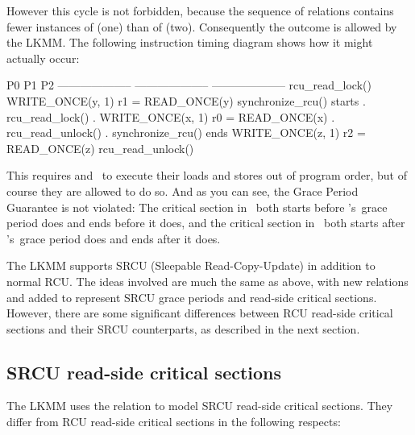 However this cycle is not forbidden, because the sequence of
relations contains fewer instances of  (one) than of
 (two).
Consequently the outcome is allowed by the LKMM\@.
The following instruction timing diagram shows how it might actually
occur:

\begin{VerbatimU}
P0                      P1                      P2
--------------------    --------------------    --------------------
rcu_read_lock()
WRITE_ONCE(y, 1)
                        r1 = READ_ONCE(y)
                        synchronize_rcu() starts
                        .                       rcu_read_lock()
                        .                       WRITE_ONCE(x, 1)
r0 = READ_ONCE(x)       .
rcu_read_unlock()       .
                        synchronize_rcu() ends
                        WRITE_ONCE(z, 1)
                                                r2 = READ_ONCE(z)
                                                rcu_read_unlock()
\end{VerbatimU}

This requires  and~ to execute their loads and stores out of
program order, but of course they are allowed to do so.
And as you can see, the Grace Period Guarantee is not violated:
The critical section in~ both starts before 's~grace
period does and ends before it does, and the critical section in~
both starts after 's~grace period does and ends after it does.

The LKMM supports SRCU (Sleepable Read-Copy-Update) in addition to
normal RCU\@.
The ideas involved are much the same as above, with new
relations  and  added to represent SRCU
grace periods and read-side critical sections.
However, there are some significant differences between RCU read-side
critical sections and their SRCU counterparts, as described in the
next section.


\subsection{SRCU read-side critical sections}
\label{sec:docs:explanation:SRCU Read-side Critical Sections}

The LKMM uses the  relation to model SRCU read-side critical
sections.
They differ from RCU read-side critical sections in the following respects:

